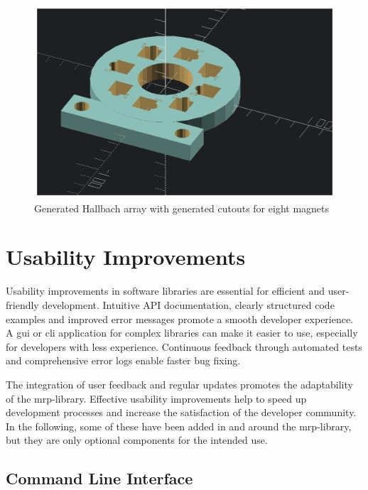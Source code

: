 \begin{figure}
\centering
\includegraphics{./generated_images/border_Generated_Hallbach_array_with_generated_cutouts_for_eight_magnets.png}
\caption{Generated Hallbach array with generated cutouts for eight
magnets
\label{Generated_Hallbach_array_with_generated_cutouts_for_eight_magnets.png}}
\end{figure}

\hypertarget{usability-improvements}{%
\chapter{Usability Improvements}\label{usability-improvements}}

Usability improvements in software libraries are essential for efficient
and user-friendly development. Intuitive API documentation, clearly
structured code examples and improved error messages promote a smooth
developer experience. A \gls{gui} or \gls{cli} application for complex
libraries can make it easier to use, especially for developers with less
experience. Continuous feedback through automated tests and
comprehensive error logs enable faster bug fixing.

The integration of user feedback and regular updates promotes the
adaptability of the \gls{mrp}-library. Effective usability improvements
help to speed up development processes and increase the satisfaction of
the developer community. In the following, some of these have been added
in and around the \gls{mrp}-library, but they are only optional
components for the intended use.

\hypertarget{command-line-interface}{%
\section{Command Line Interface}\label{command-line-interface}}


